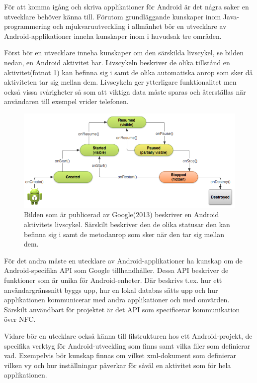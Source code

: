 \documentclass[11pt]{article}
\begin{document}
För att komma igång och skriva applikationer för Android är det några saker en utvecklare behöver känna till. Förutom grundläggande kunskaper inom Java-programmering och mjukvaruutveckling i allmänhet bör en utvecklare av Android-applikationer inneha kunskaper inom i huvudsak tre områden.

Först bör en utvecklare inneha kunskaper om den särskilda livscykel, se bilden nedan, en Android aktivitet har. Livscykeln beskriver de olika tillstånd en aktivitet(fotnot 1) kan befinna sig i samt de olika automatiska anrop som sker då aktiviteten tar sig mellan dem. Livscykeln ger ytterligare funktionalitet men också vissa svårigheter så som att viktiga data måste sparas och återställas när användaren till exempel vrider telefonen.

\begin{figure}[H]
\centering
\includegraphics[scale=0.7]{Android_aktivitet.png}
\caption{Bilden som är publicerad av Google(2013) beskriver en Android aktivitets livscykel. Särskilt beskriver den de olika statusar den kan befinna sig i samt de metodanrop som sker när den tar sig mellan dem.}
\label{Fig:Android_aktivitet}
\end{figure}

För det andra måste en utecklare av Android-applikationer ha kunskap om de Android-specifika API som Google tillhandhåller. Dessa API beskriver de funktioner som är unika för Android-enheter. Där beskrivs t.ex. hur ett användargränssnitt byggs upp, hur en lokal databas sätts upp och hur applikationen kommunicerar med andra applikationer och med omvärden. Särskilt användbart för projektet är det API som specificerar kommunikation över NFC.

Vidare bör en utecklare också känna till filstrukturen hos ett Android-projekt, de specifika verktyg för Android-utveckling som finns samt vilka filer som definierar vad. Exempelvis bör kunskap finnas om vilket xml-dokument som definierar vilken vy och hur inställningar påverkar för såväl en aktivitet som för hela applikationen.
\end{document}
